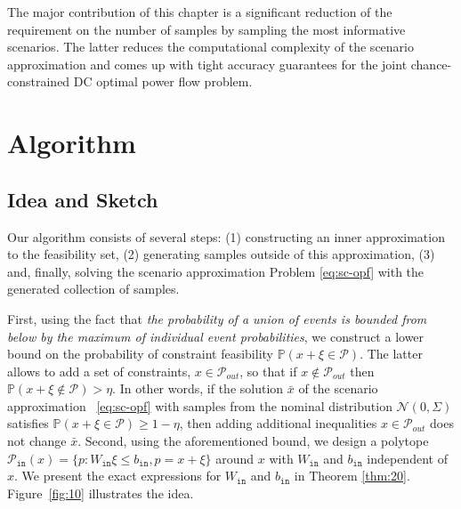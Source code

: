 The major contribution of this chapter is a significant reduction of the requirement on the number of samples by sampling the most informative scenarios. The latter reduces the computational complexity of the scenario approximation and comes up with tight accuracy guarantees for the joint chance-constrained DC optimal power flow problem. 


\section{Algorithm}\label{sec:algo}

\subsection{Idea and Sketch}
Our algorithm consists of several steps: 
(1) constructing an inner approximation to the feasibility set,
(2) generating samples outside of this approximation,
(3) and, finally, solving the scenario approximation Problem \eqref{eq:sc-opf} with the generated collection of samples.

First, using the fact that \emph{the probability of a union of events is bounded from below by the maximum of individual event probabilities}, we construct a lower bound on the probability of constraint feasibility $\mathbb{P}(x+\xi \in \mathcal{P})$. The latter allows to add a set of constraints, $x\in \mathcal{P}_{out}$, so that if $x\not\in \mathcal{P}_{out}$ then $\mathbb{P}(x+\xi \notin \mathcal{P}) > \eta$. In other words, if the solution $\bar x$ of the scenario approximation~ \eqref{eq:sc-opf} with samples from the nominal distribution $\mathcal{N}(0,\Sigma)$ satisfies $\mathbb{P}(x+\xi \in \mathcal{P}) \ge 1-\eta$, then adding additional inequalities $x\in \mathcal{P}_{out}$ does not change $\bar x$. Second, using the aforementioned bound, we design a polytope $\mathcal{P}_{\texttt{in}}(x) = \{p: W_{\texttt{in}} \xi \le b_{\texttt{in}}, p = x+\xi\}$ around $x$ with $W_{\texttt{in}}$ and $b_{\texttt{in}}$ independent of $x$. We present the exact expressions for $W_{\texttt{in}}$ and $b_{\texttt{in}}$ in Theorem \ref{thm:20}. Figure~\ref{fig:10} illustrates the idea. 

